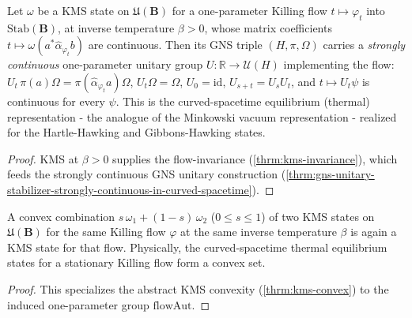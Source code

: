 \begin{theorem}
    \label{thrm:kms-thermal-representation-in-curved-spacetime}
    \leanok
    Let $\omega$ be a KMS state on $\mathfrak{U}(\mathbf{B})$ for a one-parameter Killing flow $t \mapsto \varphi_t$ into $\mathrm{Stab}(\mathbf{B})$, at inverse temperature $\beta > 0$, whose matrix coefficients $t \mapsto \omega(a^* \hat\alpha_{\varphi_t} b)$ are continuous. Then its GNS triple $(H, \pi, \Omega)$ carries a \emph{strongly continuous} one-parameter unitary group $U : \mathbb{R} \to \mathcal{U}(H)$ implementing the flow: $U_t\,\pi(a)\Omega = \pi(\hat\alpha_{\varphi_t} a)\Omega$, $U_t\Omega = \Omega$, $U_0 = \mathrm{id}$, $U_{s+t} = U_s U_t$, and $t \mapsto U_t\psi$ is continuous for every $\psi$. This is the curved-spacetime equilibrium (thermal) representation - the analogue of the Minkowski vacuum representation - realized for the Hartle-Hawking and Gibbons-Hawking states.
\end{theorem}
\begin{proof}
    \leanok
    KMS at $\beta > 0$ supplies the flow-invariance (\ref{thrm:kms-invariance}), which feeds the strongly continuous GNS unitary construction (\ref{thrm:gns-unitary-stabilizer-strongly-continuous-in-curved-spacetime}).
\end{proof}

\begin{theorem}
    \label{thrm:kms-convex-for-flow-in-curved-spacetime}
    \leanok
    A convex combination $s\,\omega_1 + (1-s)\,\omega_2$ ($0 \le s \le 1$) of two KMS states on $\mathfrak{U}(\mathbf{B})$ for the same Killing flow $\varphi$ at the same inverse temperature $\beta$ is again a KMS state for that flow. Physically, the curved-spacetime thermal equilibrium states for a stationary Killing flow form a convex set.
\end{theorem}
\begin{proof}
    \leanok
    This specializes the abstract KMS convexity (\ref{thrm:kms-convex}) to the induced one-parameter group $\mathrm{flowAut}$.
\end{proof}

